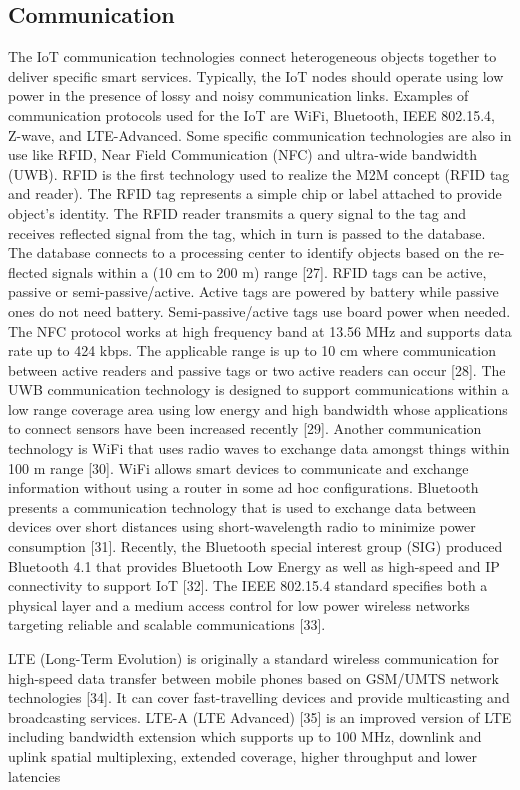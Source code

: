 \subsection{Communication}

The IoT communication technologies connect heterogeneous
objects together to deliver specific smart services. Typically, the
IoT nodes should operate using low power in the presence of
lossy and noisy communication links. Examples of communication
protocols used for the IoT are WiFi, Bluetooth, IEEE
802.15.4, Z-wave, and LTE-Advanced. Some specific communication
technologies are also in use like RFID, Near Field Communication
(NFC) and ultra-wide bandwidth (UWB). RFID is
the first technology used to realize the M2M concept (RFID
tag and reader). The RFID tag represents a simple chip or label
attached to provide object’s identity. The RFID reader transmits
a query signal to the tag and receives reflected signal from the
tag, which in turn is passed to the database. The database connects
to a processing center to identify objects based on the re-
flected signals within a (10 cm to 200 m) range [27]. RFID tags
can be active, passive or semi-passive/active. Active tags are
powered by battery while passive ones do not need battery.
Semi-passive/active tags use board power when needed.
The NFC protocol works at high frequency band at 13.56 MHz
and supports data rate up to 424 kbps. The applicable range is
up to 10 cm where communication between active readers and
passive tags or two active readers can occur [28]. The UWB communication
technology is designed to support communications
within a low range coverage area using low energy and high
bandwidth whose applications to connect sensors have been
increased recently [29].
Another communication technology is WiFi that uses radio
waves to exchange data amongst things within 100 m range
[30]. WiFi allows smart devices to communicate and exchange
information without using a router in some ad hoc configurations.
Bluetooth presents a communication technology that is
used to exchange data between devices over short distances using
short-wavelength radio to minimize power consumption [31].
Recently, the Bluetooth special interest group (SIG) produced
Bluetooth 4.1 that provides Bluetooth Low Energy as well as
high-speed and IP connectivity to support IoT [32]. The IEEE
802.15.4 standard specifies both a physical layer and a medium
access control for low power wireless networks targeting reliable
and scalable communications [33].

LTE (Long-Term Evolution) is originally a standard wireless
communication for high-speed data transfer between mobile
phones based on GSM/UMTS network technologies [34]. It
can cover fast-travelling devices and provide multicasting and
broadcasting services. LTE-A (LTE Advanced) [35] is an improved
version of LTE including bandwidth extension which
supports up to 100 MHz, downlink and uplink spatial multiplexing,
extended coverage, higher throughput and lower latencies


